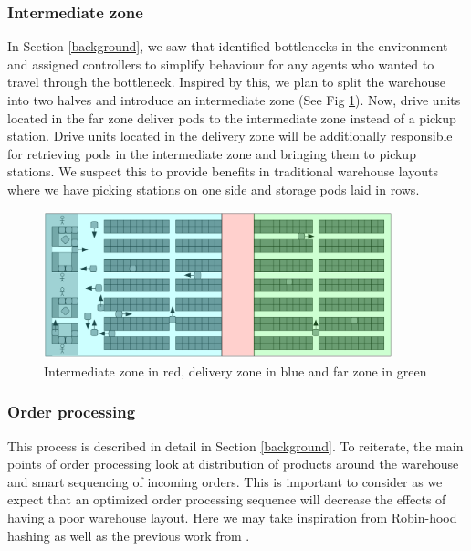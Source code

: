 \documentclass[a4paper,11pt]{article}
\begin{document}
\subsubsection{Intermediate zone}
\label{intermediatezone}
In Section \ref{background}, we saw that \cite{wilt2014spatially} identified bottlenecks in the environment and assigned controllers to simplify behaviour for any agents who wanted to travel through the bottleneck. Inspired by this, we plan to split the warehouse into two halves and introduce an intermediate zone (See Fig \ref{kivalayout2}). Now, drive units located in the far zone deliver pods to the intermediate zone instead of a pickup station. Drive units located in the delivery zone will be additionally responsible for retrieving pods in the intermediate zone and bringing them to pickup stations. We suspect this to provide benefits in traditional warehouse layouts where we have picking stations on one side and storage pods laid in rows.

\begin{figure}[h]
	\centering
	\includegraphics[width=0.9\textwidth]{graphics/kivasystemlayout_adjusted}
	\caption{Intermediate zone in red, delivery zone in blue and far zone in green}
	\label{kivalayout2}
\end{figure}

\subsubsection{Order processing}
\label{orderprocessing}
This process is described in detail in Section \ref{background}. To reiterate, the main points of order processing look at distribution of products around the warehouse and smart sequencing of incoming orders. This is important to consider as we expect that an optimized order processing sequence will decrease the effects of having a poor warehouse layout. Here we may take inspiration from Robin-hood hashing as well as the previous work from \cite{boysen2017parts}.
\end{document}
